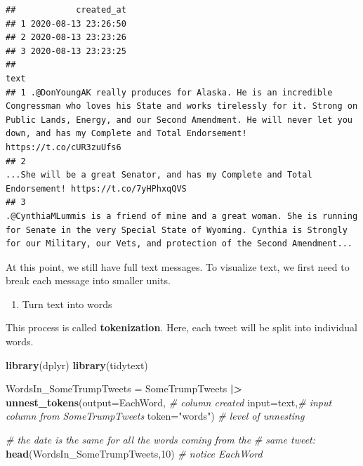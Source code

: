 \documentclass[
]{article}
\newenvironment{Shaded}{\begin{snugshade}}{\end{snugshade}}
\newcommand{\AttributeTok}[1]{\textcolor[rgb]{0.13,0.29,0.53}{#1}}
\newcommand{\CommentTok}[1]{\textcolor[rgb]{0.56,0.35,0.01}{\textit{#1}}}
\newcommand{\DecValTok}[1]{\textcolor[rgb]{0.00,0.00,0.81}{#1}}
\newcommand{\FunctionTok}[1]{\textcolor[rgb]{0.13,0.29,0.53}{\textbf{#1}}}
\newcommand{\NormalTok}[1]{#1}
\newcommand{\OtherTok}[1]{\textcolor[rgb]{0.56,0.35,0.01}{#1}}
\newcommand{\SpecialCharTok}[1]{\textcolor[rgb]{0.81,0.36,0.00}{\textbf{#1}}}
\newcommand{\StringTok}[1]{\textcolor[rgb]{0.31,0.60,0.02}{#1}}
\providecommand{\tightlist}{%
  \setlength{\itemsep}{0pt}\setlength{\parskip}{0pt}}
\begin{document}
\begin{verbatim}
##            created_at
## 1 2020-08-13 23:26:50
## 2 2020-08-13 23:23:26
## 3 2020-08-13 23:23:25
##                                                                                                                                                                                                                                                                                 text
## 1 .@DonYoungAK really produces for Alaska. He is an incredible Congressman who loves his State and works tirelessly for it. Strong on Public Lands, Energy, and our Second Amendment. He will never let you down, and has my Complete and Total Endorsement! https://t.co/cUR3zuUfs6
## 2                                                                                                                                                                                 ...She will be a great Senator, and has my Complete and Total Endorsement! https://t.co/7yHPhxqQVS
## 3                                                                  .@CynthiaMLummis is a friend of mine and a great woman. She is running for Senate in the very Special State of Wyoming. Cynthia is Strongly for our Military, our Vets, and protection of the Second Amendment...
\end{verbatim}

At this point, we still have full text messages. To visualize text, we
first need to break each message into smaller units.

\begin{enumerate}
\def\labelenumi{\arabic{enumi}.}
\setcounter{enumi}{2}
\tightlist
\item
  Turn text into words
\end{enumerate}

This process is called \textbf{tokenization}. Here, each tweet will be
split into individual words.

\begin{Shaded}
\begin{Highlighting}[]
\FunctionTok{library}\NormalTok{(dplyr)}
\FunctionTok{library}\NormalTok{(tidytext) }

\NormalTok{WordsIn\_SomeTrumpTweets }\OtherTok{=}\NormalTok{ SomeTrumpTweets }\SpecialCharTok{|\textgreater{}}
                 \FunctionTok{unnest\_tokens}\NormalTok{(}\AttributeTok{output=}\NormalTok{EachWord, }\CommentTok{\# column created}
                               \AttributeTok{input=}\NormalTok{text,}\CommentTok{\# input column from SomeTrumpTweets}
                               \AttributeTok{token=}\StringTok{"words"}\NormalTok{) }\CommentTok{\# level of unnesting}

\CommentTok{\# the date is the same for all the words coming from the}
\CommentTok{\# same tweet:}
\FunctionTok{head}\NormalTok{(WordsIn\_SomeTrumpTweets,}\DecValTok{10}\NormalTok{) }\CommentTok{\# notice \textquotesingle{}EachWord\textquotesingle{}}
\end{Highlighting}
\end{Shaded}
\end{document}
